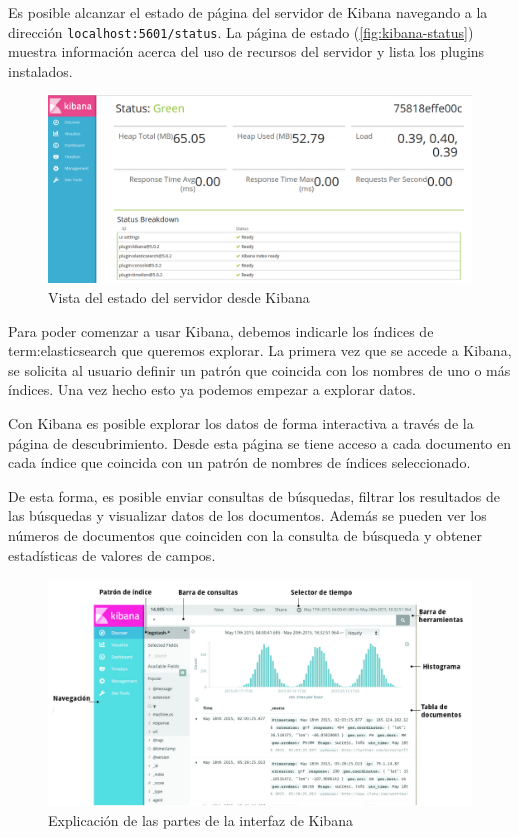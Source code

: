 Es posible alcanzar el estado de página del servidor de Kibana navegando a la dirección \lstinline{localhost:5601/status}. La página de estado (\autoref{fig:kibana-status}) muestra información acerca del uso de recursos del servidor y lista los plugins instalados.

\begin{figure}
  \includegraphics[width=\linewidth]{src/images/05-capitulo-5/kibanastatus.jpg}
  \caption{Vista del estado del servidor desde Kibana}
  \label{fig:kibana-status}
\end{figure}


Para poder comenzar a usar Kibana, debemos indicarle los índices de \gls{term:elasticsearch} que queremos explorar. La primera vez que se accede a Kibana, se solicita al usuario definir un patrón que coincida con los nombres de uno o más índices. Una vez hecho esto ya podemos empezar a explorar datos.



Con Kibana es posible explorar los datos de forma interactiva a través de la página de descubrimiento. Desde esta página se tiene acceso a cada documento en cada índice que coincida con un patrón de nombres de índices seleccionado.

De esta forma, es posible enviar consultas de búsquedas, filtrar los resultados de las búsquedas y visualizar datos de los documentos. Además se pueden ver los números de documentos que coinciden con la consulta de búsqueda y obtener estadísticas de valores de campos.

\begin{figure}
  \includegraphics[width=\linewidth]{src/images/05-capitulo-5/kibana-ux.png}
  \caption{Explicación de las partes de la interfaz de Kibana}
  \label{fig:kibana-ux}
\end{figure}


